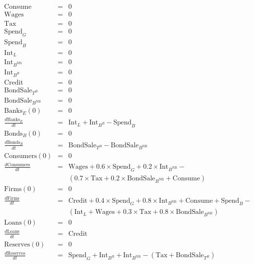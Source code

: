 \begin{eqnarray*}
\mathrm{Consume}&=&0\\
\mathrm{Wages}&=&0\\
\mathrm{Tax}&=&0\\
\mathrm{Spend}_{G}&=&0\\
\mathrm{Spend}_{B}&=&0\\
\mathrm{Int}_{L}&=&0\\
\mathrm{Int}_{B^{\mathrm{{NB}}}}&=&0\\
\mathrm{Int}_{B^{B}}&=&0\\
\mathrm{Credit}&=&0\\
\mathrm{BondSale}_{T^{B}}&=&0\\
\mathrm{BondSale}_{B^{\mathrm{{NB}}}}&=&0\\
\mathrm{Banks}_{E}(0)&=&0\\
\frac{ d \mathrm{Banks}_{E}}{dt} &=&\mathrm{Int}_{L}+\mathrm{Int}_{B^{B}}-\mathrm{Spend}_{B}\\
\mathrm{Bonds}_{B}(0)&=&0\\
\frac{ d \mathrm{Bonds}_{B}}{dt} &=&\mathrm{BondSale}_{T^{B}}-\mathrm{BondSale}_{B^{\mathrm{{NB}}}}\\
\mathrm{Consumers}(0)&=&0\\
\frac{ d \mathrm{Consumers}}{dt} &=&\mathrm{Wages}+0.6\times
                                     \mathrm{Spend}_{G}+0.2\times
                                     \mathrm{Int}_{B^{\mathrm{{NB}}}}-\\
  &&\left(0.7\times \mathrm{Tax}+0.2\times \mathrm{BondSale}_{B^{\mathrm{{NB}}}}+\mathrm{Consume}\right)\\
\mathrm{Firms}(0)&=&0\\
\frac{ d \mathrm{Firms}}{dt} &=&\mathrm{Credit}+0.4\times
                                 \mathrm{Spend}_{G}+0.8\times
                                 \mathrm{Int}_{B^{\mathrm{{NB}}}}+\mathrm{Consume}+\mathrm{Spend}_{B}-\\
  &&\left(\mathrm{Int}_{L}+\mathrm{Wages}+0.3\times \mathrm{Tax}+0.8\times \mathrm{BondSale}_{B^{\mathrm{{NB}}}}\right)\\
\mathrm{Loans}(0)&=&0\\
\frac{ d \mathrm{Loans}}{dt} &=&\mathrm{Credit}\\
\mathrm{Reserves}(0)&=&0\\
\frac{ d \mathrm{Reserves}}{dt} &=&\mathrm{Spend}_{G}+\mathrm{Int}_{B^{B}}+\mathrm{Int}_{B^{\mathrm{{NB}}}}-\left(\mathrm{Tax}+\mathrm{BondSale}_{T^{B}}\right)\\
\end{eqnarray*}


